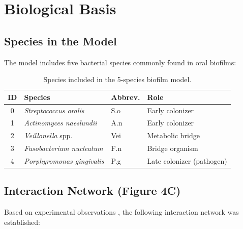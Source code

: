 \documentclass[11pt,a4paper]{article}
\begin{document}
\section{Biological Basis}

\subsection{Species in the Model}

The model includes five bacterial species commonly found in oral biofilms:

\begin{table}[h]
\centering
\begin{tabular}{clll}
\toprule
\textbf{ID} & \textbf{Species} & \textbf{Abbrev.} & \textbf{Role} \\
\midrule
0 & \textit{Streptococcus oralis} & S.o & Early colonizer \\
1 & \textit{Actinomyces naeslundii} & A.n & Early colonizer \\
2 & \textit{Veillonella} spp. & Vei & Metabolic bridge \\
3 & \textit{Fusobacterium nucleatum} & F.n & Bridge organism \\
4 & \textit{Porphyromonas gingivalis} & P.g & Late colonizer (pathogen) \\
\bottomrule
\end{tabular}
\caption{Species included in the 5-species biofilm model.}
\label{tab:species}
\end{table}

\subsection{Interaction Network (Figure 4C)}

Based on experimental observations \cite{Heine2025PeriImplant}, the following interaction network was established:
\end{document}
